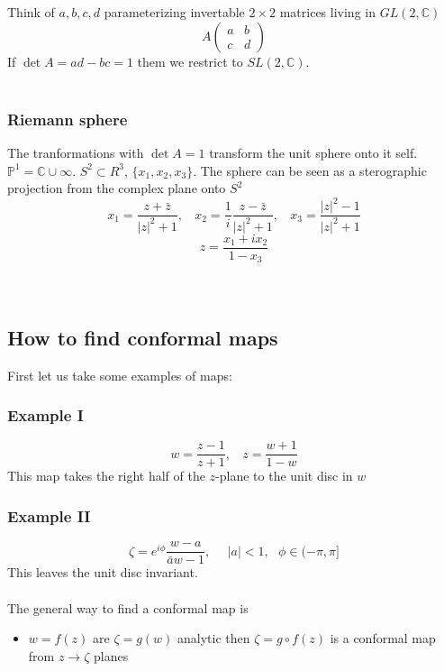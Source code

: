 \documentclass[a4paper,12pt]{article}
\begin{document}
Think of $a,b,c,d$ parameterizing invertable $2\times 2$ matrices living in $GL(2,\mathds{C})$
\begin{equation}
A\begin{pmatrix}
a & b \\c& d
\end{pmatrix}
\end{equation}
If $\det A=ad-bc=1$ them we restrict to $SL(2,\mathds{C})$. \\\\
\subsubsection{Riemann sphere}
The tranformations with $\det A=1$ transform the unit sphere onto it self. $\mathds{P}^1=\mathds{C}\cup \infty$. $S^2\subset R^3$, $\{x_1,x_2,x_3\}$. The sphere can be seen as a sterographic projection from the complex plane onto $S^2$
\begin{equation}
x_1=\frac{z+\bar z}{|z|^2+1},~~~~x_2=\frac{1}{i}\frac{z-\bar z}{|z|^2+1},~~~~x_3=\frac{|z|^2-1}{|z|^2+1}
\end{equation}
\begin{equation}
z=\frac{x_1+ix_2}{1-x_3}
\end{equation}\\\\
\subsection{How to find conformal maps}
First let us take some examples of maps:
\subsubsection{Example I}
\begin{equation}
w=\frac{z-1}{z+1},~~~~z=\frac{w+1}{1-w}
\end{equation}
This map takes the right half of the $z$-plane to the unit disc in $w$
\subsubsection{Example II}
\begin{equation}
\zeta= e^{i\phi}\frac{w-a}{\bar a w-1},~~~~~~|a|<1,~~~\phi\in (-\pi,\pi]
\end{equation}
This leaves the unit disc invariant.\\\\
The general way to find a conformal map is
\begin{itemize}
\item $w=f(z)$ are $\zeta=g(w)$ analytic then $\zeta= g\circ f(z)$ is a conformal map from $z\to \zeta$ planes
\end{itemize}
\end{document}

